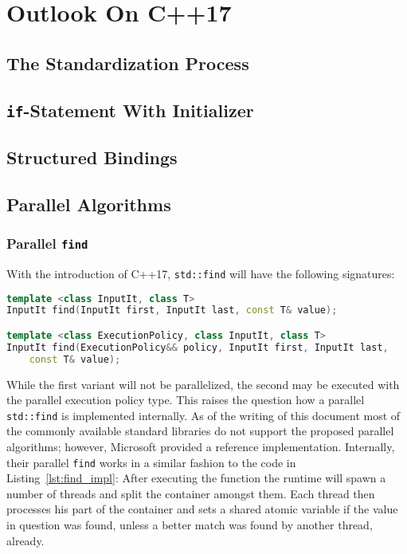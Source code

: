 \section{Outlook On C++17}

\subsection{The Standardization Process}

\subsection{\texttt{if}-Statement With Initializer}
\subsection{Structured Bindings}
\subsection{Parallel Algorithms}

\subsubsection{Parallel \texttt{find}}

With the introduction of C++17, \texttt{std::find} will have the following signatures:

\begin{lstlisting}[language=C++]
template <class InputIt, class T>
InputIt find(InputIt first, InputIt last, const T& value);

template <class ExecutionPolicy, class InputIt, class T>
InputIt find(ExecutionPolicy&& policy, InputIt first, InputIt last,
    const T& value);
\end{lstlisting}

While the first variant will not be parallelized, the second may be executed with the parallel execution policy type. This raises the question how a parallel \texttt{std::find} is implemented internally. As of the writing of this document most of the commonly available standard libraries do not support the proposed parallel algorithms; however, Microsoft provided a reference implementation. Internally, their parallel \texttt{find} works in a similar fashion to the code in Listing~\ref{lst:find_impl}: After executing the function the runtime will spawn a number of threads and split the container amongst them. Each thread then processes his part of the container and sets a shared atomic variable if the value in question was found, unless a better match was found by another thread, already.

